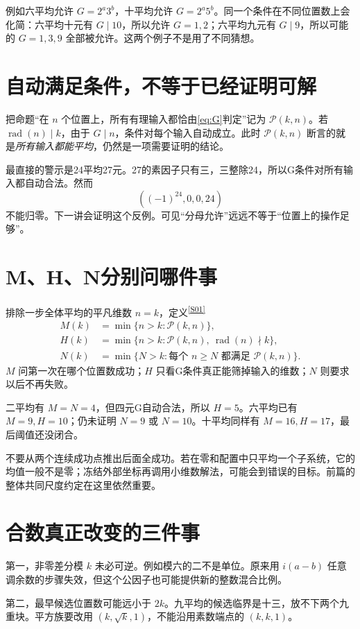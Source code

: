 \documentclass[11pt,a4paper,oneside,openany]{book}
\newcommand{\rad}{\operatorname{rad}}\newcommand{\diag}{\operatorname{diag}}
\newcommand{\src}[1]{\textsuperscript{\hyperref[source:#1]{[#1]}}}
\theoremstyle{definition}\newtheorem{example}[theorem]{例}\newtheorem{conjecture}[theorem]{猜想}
\numberwithin{equation}{chapter}\setcounter{tocdepth}{1}
\begin{document}
例如六平均允许 $G=2^a3^b$，十平均允许 $G=2^a5^b$。同一个条件在不同位置数上会化简：六平均十元有 $G\mid10$，所以允许 $G=1,2$；六平均九元有 $G\mid9$，所以可能的 $G=1,3,9$ 全部被允许。这两个例子不是用了不同猜想。

\section{自动满足条件，不等于已经证明可解}
把命题“在 $n$ 个位置上，所有有理输入都恰由\eqref{eq:G}判定”记为 $\mathcal P(k,n)$。若 $\rad(n)\mid k$，由于 $G\mid n$，条件对每个输入自动成立。此时 $\mathcal P(k,n)$ 断言的就是\emph{所有输入都能平均}，仍然是一项需要证明的结论。

最直接的警示是24平均27元。27的素因子只有三，三整除24，所以G条件对所有输入都自动合法。然而
\[((-1)^{24},0,0,24)
\]
不能归零。下一讲会证明这个反例。可见“分母允许”远远不等于“位置上的操作足够”。

\section{M、H、N分别问哪件事}
排除一步全体平均的平凡维数 $n=k$，定义\src{S01}
\begin{align*}
M(k)&=\min\{n>k:\mathcal P(k,n)\},\\
H(k)&=\min\{n>k:\mathcal P(k,n),\ \rad(n)\nmid k\},\\
N(k)&=\min\{N>k:\text{每个 }n\ge N\text{ 都满足 }\mathcal P(k,n)\}.
\end{align*}
$M$ 问第一次在哪个位置数成功；$H$ 只看G条件真正能筛掉输入的维数；$N$ 则要求以后不再失败。

二平均有 $M=N=4$，但四元G自动合法，所以 $H=5$。六平均已有 $M=9,H=10$；仍未证明 $N=9$ 或 $N=10$。十平均同样有 $M=16,H=17$，最后阈值还没闭合。

不要从两个连续成功点推出后面全成功。若在零和配置中只平均一个子系统，它的均值一般不是零；冻结外部坐标再调用小维数解法，可能会到错误的目标。前篇的整体共同尺度约定在这里依然重要。

\section{合数真正改变的三件事}
第一，非零差分模 $k$ 未必可逆。例如模六的二不是单位。原来用 $i(a-b)$ 任意调余数的步骤失效，但这个公因子也可能提供新的整数混合比例。

第二，最早候选位置数可能远小于 $2k$。九平均的候选临界是十三，放不下两个九重块。平方族要改用 $(k,\sqrt k,1)$，不能沿用素数端点的 $(k,k,1)$。
\end{document}

